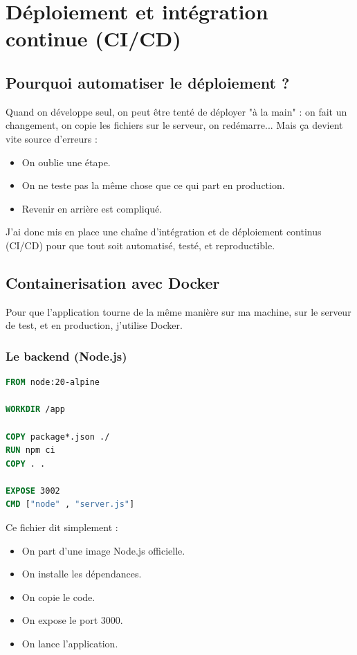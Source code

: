 \chapter{Déploiement et intégration continue (CI/CD)}

\section{Pourquoi automatiser le déploiement ?}

Quand on développe seul, on peut être tenté de déployer "à la main" : on fait un changement, on copie les fichiers sur le serveur, on redémarre... Mais ça devient vite source d'erreurs :
\begin{itemize}
    \item On oublie une étape.
    \item On ne teste pas la même chose que ce qui part en production.
    \item Revenir en arrière est compliqué.
\end{itemize}

J'ai donc mis en place une chaîne d'intégration et de déploiement continus (CI/CD) pour que tout soit automatisé, testé, et reproductible.

\section{Containerisation avec Docker}

Pour que l'application tourne de la même manière sur ma machine, sur le serveur de test, et en production, j'utilise Docker.

\subsection{Le backend (Node.js)}

\begin{lstlisting}[language=dockerfile]
FROM node:20-alpine

WORKDIR /app

COPY package*.json ./
RUN npm ci
COPY . .

EXPOSE 3002
CMD ["node" , "server.js"]
\end{lstlisting}

Ce fichier dit simplement :
\begin{itemize}
    \item On part d'une image Node.js officielle.
    \item On installe les dépendances.
    \item On copie le code.
    \item On expose le port 3000.
    \item On lance l'application.
\end{itemize}

